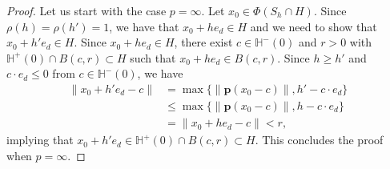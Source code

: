 \documentclass[a4paper, 11pt]{article}
\theoremstyle{plain}
\theoremstyle{definition}
\numberwithin{equation}{section}
\begin{document}
\begin{proof}
    Let us start with the case $p=\infty$. Let $x_0\in\Phi(S_h\cap H)$. Since $\rho(h)=\rho(h')=1$, we have that $x_0+he_d\in H$ and we need to show that $x_0+h'e_d\in H$. Since $x_0+he_d\in H$, there exist $c\in\mathbb H^-(0)$ and $r>0$ with $\mathbb H^+(0)\cap B(c,r)\subset H$ such that $x_0+he_d\in B(c, r)$. Since $h\geq h'$ and $c\cdot e_d\leq 0$ from $c\in\mathbb H^-(0)$, we have
        \begin{equation*}
            \begin{split}
                \|x_0+h'e_d-c\|&=\max\{\|\mathbf p(x_0-c)\|, h'-c\cdot e_d\}\\
                &\leq\max\{\|\mathbf p(x_0-c)\|, h-c\cdot e_d\}\\
                &=\|x_0+he_d-c\|<r,
            \end{split}
        \end{equation*}
    implying that $x_0+h'e_d\in \mathbb H^+(0)\cap B(c,r)\subset H$. This concludes the proof when $p=\infty$.


\end{proof}
\end{document}
